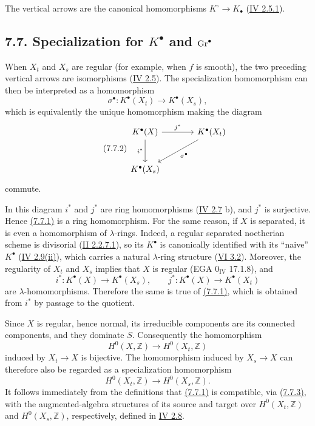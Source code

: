 The vertical arrows are the canonical homomorphisms
$K^\circ\to K_\bullet$ (\hyperlink{sga6.e04.eq.2-5-1}{IV 2.5.1}).

\subsection*{7.7. Specialization for $K^\bullet$ and $\operatorname{Gr}^\bullet$}
When $X_t$ and $X_s$ are regular (for example, when $f$ is smooth), the two
preceding vertical arrows are isomorphisms (\hyperlink{sga6.e04.para.2-5}{IV 2.5}). The specialization
homomorphism can then be interpreted as a homomorphism
\begin{equation}\tag{7.7.1}
\sigma^\bullet:K^\bullet(X_t)\longrightarrow K^\bullet(X_s),
\end{equation}
which is equivalently the unique homomorphism making the diagram
\begin{equation}\tag{7.7.2}
\begin{tikzcd}[column sep=large,row sep=large]
K^\bullet(X) \arrow[r,"j^*"] \arrow[d,"i^*"'] &
K^\bullet(X_t) \arrow[dl,"\sigma^\bullet"]\\
K^\bullet(X_s) &
\end{tikzcd}
\end{equation}
commute.

In this diagram $i^*$ and $j^*$ are ring homomorphisms (\hyperlink{sga6.e04.para.2-7}{IV 2.7} b), and
$j^*$ is surjective. Hence \hyperlink{sga6.e10.eq.7-7-1}{(7.7.1)} is a ring homomorphism. For the same
reason, if $X$ is separated, it is even a homomorphism of $\lambda$-rings.
Indeed, a regular separated noetherian scheme is divisorial (\hyperlink{sga6.e02.cor.2-2-7-1}{II 2.2.7.1}),
so its $K^\bullet$ is canonically identified with its ``naive''
$K^\bullet$ (\hyperlink{sga6.e04.para.2-9}{IV 2.9(ii)}), which carries a natural $\lambda$-ring structure
(\hyperlink{sga6.e06.thm.3-2}{VI 3.2}). Moreover, the regularity of $X_t$ and $X_s$ implies that $X$ is
regular (EGA $0_{\mathrm{IV}}$ 17.1.8), and
\[
i^*:K^\bullet(X)\longrightarrow K^\bullet(X_s),
\qquad
j^*:K^\bullet(X)\longrightarrow K^\bullet(X_t)
\]
are $\lambda$-homomorphisms. Therefore the same is true of \hyperlink{sga6.e10.eq.7-7-1}{(7.7.1)}, which
is obtained from $i^*$ by passage to the quotient.

Since $X$ is regular, hence normal, its irreducible components are its
connected components, and they dominate $S$. Consequently the homomorphism
\[
H^0(X,\mathbb Z)\longrightarrow H^0(X_t,\mathbb Z)
\]
induced by $X_t\to X$ is bijective. The homomorphism induced by
$X_s\to X$ can therefore also be regarded as a specialization homomorphism
\begin{equation}\tag{7.7.3}
H^0(X_t,\mathbb Z)\longrightarrow H^0(X_s,\mathbb Z).
\end{equation}
It follows immediately from the definitions that \hyperlink{sga6.e10.eq.7-7-1}{(7.7.1)} is compatible,
via \hyperlink{sga6.e10.eq.7-7-3}{(7.7.3)}, with the augmented-algebra structures of its source and target
over $H^0(X_t,\mathbb Z)$ and $H^0(X_s,\mathbb Z)$, respectively, defined
in \hyperlink{sga6.e04.para.2-8}{IV 2.8}.

